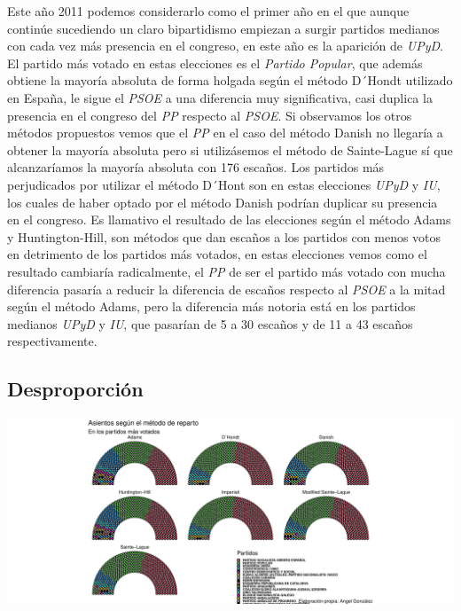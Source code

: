 \documentclass[12pt,a4paper,]{book}
\numberwithin{dummy}{section}
\theoremstyle{ocrenumbox}
\theoremstyle{blacknumex}
\theoremstyle{blacknumbox}
\theoremstyle{ocrenum}
\theoremstyle{ocrenum}
\begin{document}
Este año 2011 podemos considerarlo como el primer año en el que aunque
continúe sucediendo un claro bipartidismo empiezan a surgir partidos
medianos con cada vez más presencia en el congreso, en este año es la
aparición de \emph{UPyD}. El partido más votado en estas elecciones es
el \emph{Partido Popular}, que además obtiene la mayoría absoluta de
forma holgada según el método D´Hondt utilizado en España, le sigue el
\emph{PSOE} a una diferencia muy significativa, casi duplica la
presencia en el congreso del \emph{PP} respecto al \emph{PSOE}. Si
observamos los otros métodos propuestos vemos que el \emph{PP} en el
caso del método Danish no llegaría a obtener la mayoría absoluta pero si
utilizásemos el método de Sainte-Lague sí que alcanzaríamos la mayoría
absoluta con 176 escaños. Los partidos más perjudicados por utilizar el
método D´Hont son en estas elecciones \emph{UPyD} y \emph{IU}, los
cuales de haber optado por el método Danish podrían duplicar su
presencia en el congreso. Es llamativo el resultado de las elecciones
según el método Adams y Huntington-Hill, son métodos que dan escaños a
los partidos con menos votos en detrimento de los partidos más votados,
en estas elecciones vemos como el resultado cambiaría radicalmente, el
\emph{PP} de ser el partido más votado con mucha diferencia pasaría a
reducir la diferencia de escaños respecto al \emph{PSOE} a la mitad
según el método Adams, pero la diferencia más notoria está en los
partidos medianos \emph{UPyD} y \emph{IU}, que pasarían de 5 a 30
escaños y de 11 a 43 escaños respectivamente.

\hypertarget{desproporciuxf3n-10}{%
\subsection{Desproporción}\label{desproporciuxf3n-10}}

\begin{center}\includegraphics[width=1\linewidth]{figurasR/unnamed-chunk-107-1} \end{center}
\end{document}

